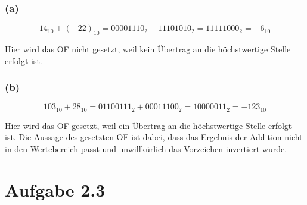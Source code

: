 \documentclass[10pt,a4paper]{article}
\begin{document}
\subsubsection*{(a)}

\begin{equation}
14_{10} + (-22)_{10} = 00001110_{2} + 11101010_{2} = 11111000_{2} = -6_{10}
\end{equation}

Hier wird das OF nicht gesetzt, weil kein Übertrag an die höchstwertige Stelle erfolgt ist.

\subsubsection*{(b)}

\begin{equation}
103_{10} + 28_{10} = 01100111_{2} + 00011100_{2} = 10000011_{2} = -123_{10}
\end{equation}

Hier wird das OF gesetzt, weil ein Übertrag an die höchstwertige Stelle erfolgt ist.
Die Aussage des gesetzten OF ist dabei, dass das Ergebnis der Addition nicht in den Wertebereich passt und unwillkürlich das Vorzeichen invertiert wurde.

\section*{Aufgabe 2.3}
\end{document}
